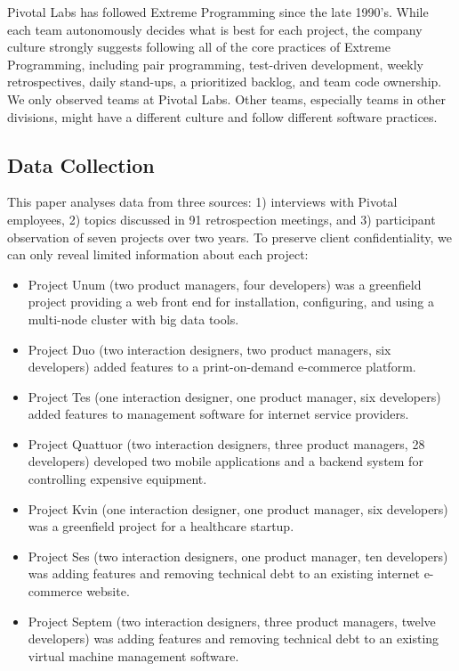 Pivotal Labs has followed Extreme Programming \cite{BeckExtremeProgramming2004} since the late 1990's. While each team autonomously decides what is best for each project, the company culture strongly suggests following all of the core practices of Extreme Programming, including pair programming, test-driven development, weekly retrospectives, daily stand-ups, a prioritized backlog, and team code ownership. We only observed teams at Pivotal Labs. Other teams, especially teams in other divisions, might have a different culture and follow different software practices.
\subsection{Data Collection}
This paper analyses data from three sources: 1) interviews with Pivotal employees, 2) topics discussed in 91 retrospection meetings, and 3) participant observation of seven projects over two years. To preserve client confidentiality, we can only reveal limited information about each project:

\begin{itemize}
\item Project Unum (two product managers, four developers) was a greenfield project providing a web front end for installation, configuring, and using a multi-node cluster with big data tools. 
\item Project Duo (two interaction designers, two product managers, six developers) added features to a print-on-demand e-commerce platform. 
\item Project Tes (one interaction designer, one product manager, six developers) added features to management software for internet service providers.
\item Project Quattuor (two interaction designers, three product managers, 28 developers) developed two mobile applications and a backend system for controlling expensive equipment.
\item Project Kvin (one interaction designer, one product manager, six developers) was a greenfield project for a healthcare startup. 
\item Project Ses (two interaction designers, one product manager, ten developers) was adding features and removing technical debt to an existing internet e-commerce website.
\item Project Septem (two interaction designers, three product managers, twelve developers) was adding features and removing technical debt to an existing virtual machine management software.
\end{itemize}
